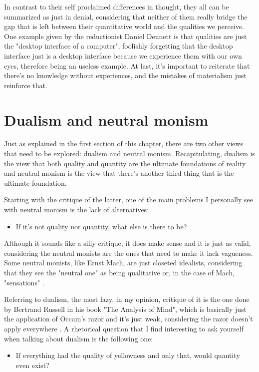In contrast to their self proclaimed differences in thought, they all can be summarized as
just in denial, considering that neither of them really bridge the gap that is left between
their quantitative world and the qualities we perceive. One example given by the reductionist
Daniel Dennett is that qualities are just the "desktop interface of a computer", foolishly
forgetting that the desktop interface just is a desktop interface because we experience them
with our own eyes, therefore being an useless example. At last, it's important to reiterate
that there's no knowledge without experiences, and the mistakes of materialism just
reinforce that.

\section{Dualism and neutral monism}
Just as explained in the first section of this chapter, there are two other views that need
to be explored: dualism and neutral monism. Recapitulating, dualism is the view that both
quality and quantity are the ultimate foundations of reality and neutral monism is the view
that there's another third thing that is the ultimate foundation.

Starting with the critique of the latter, one of the main problems I personally see with
neutral monism is the lack of alternatives:

\begin{itemize}
    \item If it's not quality nor quantity, what else is there to be?
\end{itemize}

Although it sounds like a silly critique, it does make sense and it is
just as valid, considering the neutral monists are the ones that need to make it lack
vagueness. Some neutral monists, like Ernst Mach, are just closeted idealists, considering
that they see the "neutral one" as being qualitative or, in the case of Mach, "sensations"
\cite{Mach1914}.

Referring to dualism, the most lazy, in my opinion, critique of it is the one done by
Bertrand Russell in his book "The Analysis of Mind", which is basically just the application
of Occam's razor and it's just weak, considering the razor doesn't apply everywhere
\cite{Russell1921}. A rhetorical question that I find interesting to ask yourself when
talking about dualism is the following one:

\begin{itemize}
    \item If everything had the quality of yellowness and only that, would quantity even exist?
\end{itemize}

